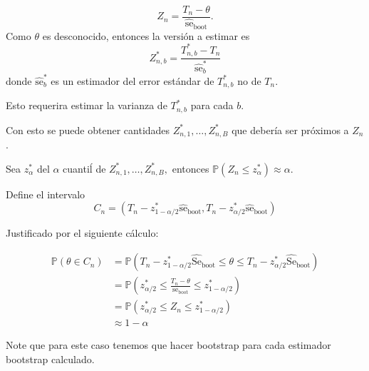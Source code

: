 \documentclass[
  12pt,
]{book}
\theoremstyle{definition}
\theoremstyle{definition}
\theoremstyle{definition}
\theoremstyle{remark}
\let\BeginKnitrBlock\begin \let\EndKnitrBlock\end
\begin{document}
\[
Z_{n}=\frac{T_{n}-\theta}{\widehat{\mathrm{se}}_{\mathrm{boot}}}.
\]
Como \(\theta\) es desconocido, entonces la versión a estimar es
\[
Z_{n, b}^{*}=\frac{T_{n, b}^{*}-T_{n}}{\widehat{\mathrm{se}}_{b}^{*}}
\]
donde \(\widehat{\mathrm{se}}_{b}^{*}\) es un estimador del error estándar de \(T_{n, b}^{*}\) no de \(T_{n}\).

\BeginKnitrBlock{remark}
{}Esto requerira estimar la varianza de \(T_{n,b}^*\) para cada \(b\).
\EndKnitrBlock{remark}

Con esto se puede obtener cantidades \(Z_{n, 1}^{*}, \ldots, Z_{n, B}^{*}\) que debería ser próximos a \(Z_{n}\).

Sea \(z_{\alpha}^{*}\) del \(\alpha\) cuantiĺ de \(Z_{n, 1}^{*}, \ldots, Z_{n, B}^{*},\) entonces \(\mathbb{P}\left(Z_{n} \leq z_{\alpha}^{*}\right) \approx \alpha\).

Define el intervalo
\begin{equation*}
C_{n}=\left(T_{n}-z_{1-\alpha / 2}^{*} \widehat{\mathrm{se}}_{\mathrm{boot}}, T_{n}-z_{\alpha / 2}^{*} \widehat{\mathrm{se}}_{\mathrm{boot}}\right)
\end{equation*}

Justificado por el siguiente cálculo:

\begin{align*}
\mathbb{P}\left(\theta \in C_{n}\right) &=\mathbb{P}\left(T_{n}-z_{1-\alpha / 2}^{*} \widehat{\mathrm{Se}}_{\mathrm{boot}} \leq \theta \leq T_{n}-z_{\alpha / 2}^{*} \widehat{\mathrm{Se}}_{\mathrm{boot}}\right) \\
&=\mathbb{P}\left(z_{\alpha / 2}^{*} \leq \frac{T_{n}-\theta}{\mathrm{se}_{\mathrm{boot}}} \leq z_{1-\alpha / 2}^{*}\right) \\
&=\mathbb{P}\left(z_{\alpha / 2}^{*} \leq Z_{n} \leq z_{1-\alpha / 2}^{*}\right) \\
& \approx 1-\alpha
\end{align*}

\BeginKnitrBlock{exercise}
\protect\hypertarget{exr:unnamed-chunk-102}{}{\label{exr:unnamed-chunk-102} }
Note que para este caso tenemos que hacer bootstrap para cada estimador bootstrap calculado.
\EndKnitrBlock{exercise}
\end{document}
